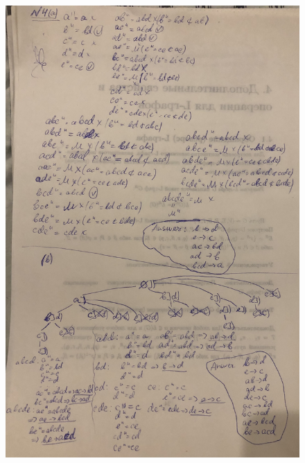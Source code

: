 \documentclass{article}
\begin{document}
\begin{figure}[h!]
	\includegraphics[width=15cm]{4.jpg}
\end{figure}

 
\end{document}
